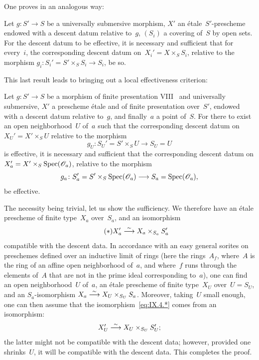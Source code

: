 One proves in an analogous way:

\begin{corollary}
\label{IX.4.3}
Let $g\colon S'\to S$ be a universally submersive morphism, $X'$
an \'etale~$S'$-prescheme endowed with a descent datum
relative to~$g$, $(S_i)$ a covering of~$S$ by
open sets. For the descent datum to be effective, it is necessary
and sufficient that for every~$i$, the corresponding descent
datum on~$X_i'=X\times_S S_i$, relative to the morphism
$g_i\colon S_i'=S'\times_S S_i\to S_i$, be so.
\end{corollary}

This last result leads to bringing out a local effectiveness
criterion:

\begin{proposition}
\label{IX.4.4}
Let $g\colon S'\to S$ be a morphism of finite presentation
\textup{VIII}~
and universally submersive, $X'$ a prescheme \'etale and
of finite presentation over~$S'$, endowed with a descent datum
relative to~$g$, and finally~$a$ a point of~$S$. For there to exist
an open neighborhood~$U$ of~$a$ such that the corresponding descent
datum on~$X_U'=X'\times_S U$ relative to the morphism
$$g_U\colon S_U'=S'\times_S U\to S_U=U$$ is effective, it is necessary and
sufficient that the corresponding descent datum on $X_a'=X'\times_S\Spec(\cal{O}_a)$, relative to the morphism
$$g_a\colon S_a'=S'\times_S\Spec(\cal{O}_a)\to S_a=\Spec(\cal{O}_a),$$
be effective.
\end{proposition}

The necessity being trivial, let us show the sufficiency. We
therefore have an \'etale prescheme of finite type~$X_a$
over~$S_a$, and an isomorphism
\begin{equation*}
\label{eq:IX.4.*}
\tag{$*$} {X_a'\overset{\sim}{\longrightarrow}X_a\times_{S_a}S_a'}
\end{equation*}
compatible with the descent data. In accordance with
an easy general sorites on preschemes
defined over an inductive limit of rings (here the rings~$A_f$,
where~$A$ is the ring of an affine open neighborhood of~$a$, and
where~$f$ runs through the elements of~$A$ that are not in
the prime ideal corresponding to~$a$), one can find an
open neighborhood~$U$ of~$a$, an \'etale prescheme of finite
type~$X_U$ over~$U=S_U$, and an $S_a$-isomorphism $X_a\overset{\sim}{\longrightarrow}
X_U\times_{S_U}S_a$. Moreover, taking~$U$ small enough, one can then
assume that the isomorphism~\eqref{eq:IX.4.*} comes from an
isomorphism:
$$
X_U'\overset{\sim}{\longrightarrow} X_U\times_{S_U} S_U';
$$
the latter might not be compatible with the descent
data; however, provided one shrinks~$U$, it will be
compatible with the descent data. This completes the
proof.

